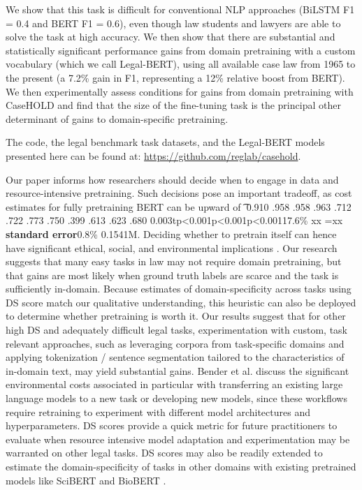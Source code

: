 \documentclass[sigconf]{acmart}
\begin{document}
We show that this task is difficult for conventional NLP approaches (BiLSTM F1 = 0.4 and BERT F1 = 0.6), even though law students and lawyers are able to solve the task at high accuracy. We then show that there are substantial and statistically significant performance gains from domain pretraining with a custom vocabulary (which we call Legal-BERT), using all available case law from 1965 to the present (a 7.2\% gain in F1, representing a 12\% relative boost from BERT). We then experimentally assess conditions for gains from domain pretraining with CaseHOLD and find that the size of the fine-tuning task is the principal other determinant of gains to domain-specific pretraining.

The code, the legal benchmark task datasets, and the Legal-BERT models presented here can be found at: \url{https://github.com/reglab/casehold}.

Our paper informs how researchers should decide when to engage in data and resource-intensive pretraining. Such decisions pose an important tradeoff, as cost estimates for fully pretraining BERT can be upward of \t{} \times {}0.910 .958 .958 .963  .712 .722 .773 .750  .399 .613 .623 .680  \pm 0.003tp<0.001p<0.001p<0.00117.6\%  \times {}xx =xx \times \textbf{standard error}0.8\% \pm 0.1541M.  Deciding whether to pretrain itself can hence have  significant ethical, social, and environmental implications \cite{Ben:Geb:McM:21}. Our research suggests that many easy tasks in law may not require domain pretraining, but that gains are most likely when ground truth labels are scarce and the task is sufficiently in-domain. Because estimates of domain-specificity across tasks using DS score match our qualitative understanding, this heuristic can also be deployed to determine whether pretraining is worth it. Our results suggest that for other high DS and adequately difficult legal tasks, experimentation with custom, task relevant approaches, such as leveraging corpora from task-specific domains and applying tokenization / sentence segmentation tailored to the characteristics of in-domain text, may yield substantial gains. Bender et al. \cite{Ben:Geb:McM:21} discuss the significant environmental costs associated in particular with transferring an existing large language models to a new task or developing new models, since these workflows require retraining to experiment with different model architectures and hyperparameters. DS scores provide a quick metric for future practitioners to evaluate when resource intensive model adaptation and experimentation may be warranted on other legal tasks. DS scores may also be readily extended to estimate the domain-specificity of tasks in other domains with existing pretrained models like SciBERT and BioBERT \cite{beltagy-etal-2019-scibert, lee_biobert_2019}.
\end{document}
